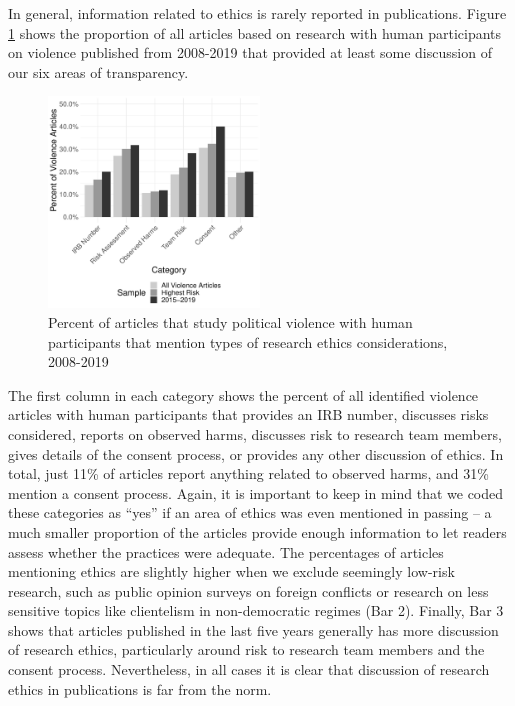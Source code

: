 In general, information related to ethics is rarely reported in publications. Figure \ref{fig:practices} shows the proportion of all articles based on research with human participants on violence published from 2008-2019 that provided at least some discussion of our six areas of transparency. 


\begin{figure}[hbt!]
    \centering
    \includegraphics[width=0.5\textwidth]{Pct_Transparent.pdf}
    \caption{Percent of articles that study political violence with human participants that mention types of research ethics considerations, 2008-2019}
    \label{fig:practices}
\end{figure}

The first column in each category shows the percent of all identified violence articles with human participants that provides an IRB number, discusses risks considered, reports on observed harms, discusses risk to research team members, gives details of the consent process, or provides any other discussion of ethics. In total, just 11\% of articles report anything related to observed harms, and 31\% mention a consent process. Again, it is important to keep in mind that we coded these categories as ``yes'' if an area of ethics was even mentioned in passing -- a much smaller proportion of the articles provide enough information to let readers assess whether the practices were adequate. The percentages of articles mentioning ethics are slightly higher when we exclude seemingly low-risk research, such as public opinion surveys on foreign conflicts or research on less sensitive topics like clientelism in non-democratic regimes (Bar 2). Finally, Bar 3 shows that articles published in the last five years generally has more discussion of research ethics, particularly around risk to research team members and the consent process. Nevertheless, in all cases it is clear that discussion of research ethics in publications is far from the norm. 

